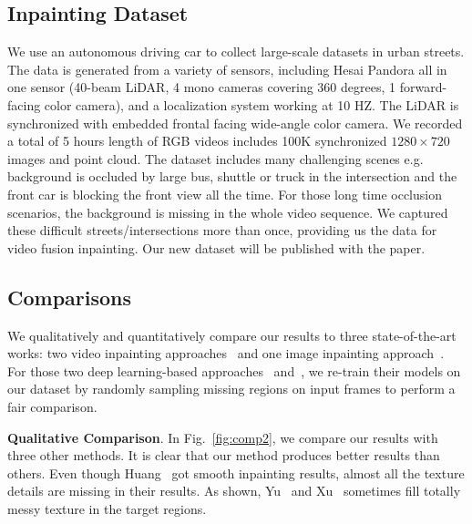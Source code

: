 \documentclass[runningheads]{llncs}
\begin{document}
\subsection{Inpainting Dataset}

We use an autonomous driving car to collect large-scale datasets in urban streets. The data is generated from a variety of sensors, including Hesai Pandora all in one sensor (40-beam LiDAR, 4 mono cameras covering 360 degrees, 1 forward-facing color camera), and a localization system working at 10 HZ. The LiDAR is synchronized with embedded frontal facing wide-angle color camera. We recorded a total of 5 hours length of RGB videos includes 100K synchronized $1280\times720$ images and point cloud. The dataset includes many challenging scenes e.g. background is occluded by large bus, shuttle or truck in the intersection and the front car is blocking the front view all the time. For those long time occlusion scenarios, the background is missing in the whole video sequence. We captured these difficult streets/intersections more than once, providing us the data for video fusion inpainting. Our new dataset will be published with the paper.

\subsection{Comparisons}

We qualitatively and quantitatively compare our results to three state-of-the-art works: two video inpainting approaches~\cite{Xu_2019_CVPR, Huang-SigAsia-2016} and one image inpainting approach~\cite{yu2018generative}. For those two deep learning-based approaches~\cite{Xu_2019_CVPR} and~\cite{yu2018generative}, we re-train their models on our dataset by randomly sampling missing regions on input frames to perform a fair comparison.
















\textbf{Qualitative Comparison}. In Fig.~\ref{fig:comp2}, we compare our results with three other methods. It is clear that our method produces better results than others. Even though Huang~\cite{Huang-SigAsia-2016} got smooth inpainting results, almost all the texture details are missing in their results. As shown, Yu~\cite{yu2018generative} and Xu~\cite{Xu_2019_CVPR} sometimes fill totally messy texture in the target regions.
\end{document}
